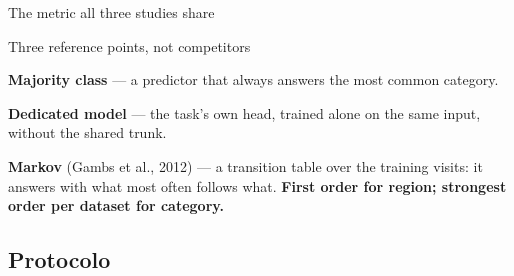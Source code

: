 \documentclass{beamer}
\begin{document}
\begin{frame}{The metric all three studies share}
    \vspace{3mm}
    \begin{block}{Three reference points, not competitors}
        {\small
        \textbf{Majority class} --- a predictor that always answers the most common category.\par
        \textbf{Dedicated model} --- the task's own head, trained alone on the same input,
        without the shared trunk.\par
        \textbf{Markov} {\scriptsize(Gambs et al., 2012)} --- a transition table over the
        training visits: it answers with what most
        often follows what. \textbf{First order for region; strongest order per dataset for
        category.}\par}
    \end{block}
\end{frame}

\subsection{Protocolo}
\end{document}
